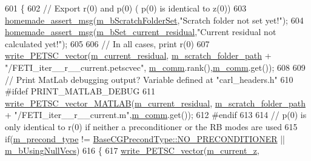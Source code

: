 \begin{DoxyCode}
601 \{
602     \textcolor{comment}{// Export r(0) and p(0) ( p(0) is identical to z(0))}
603     \hyperlink{common__header_8h_a593ccc80b790b2268653fcf6597bf451}{homemade\_assert\_msg}(\hyperlink{classcarl_1_1_f_e_t_i___operations_a8bb9de7de35a2f7d7d5982ae1085ba15}{m\_bScratchFolderSet},\textcolor{stringliteral}{"Scratch folder not set
       yet!"});
604     \hyperlink{common__header_8h_a593ccc80b790b2268653fcf6597bf451}{homemade\_assert\_msg}(\hyperlink{classcarl_1_1_f_e_t_i___operations_a1f1f890054d63bdf25937e6bf66fa5ce}{m\_bSet\_current\_residual},\textcolor{stringliteral}{"Current residual
       not calculated yet!"});
605 
606     \textcolor{comment}{// In all cases, print r(0)}
607     \hyperlink{namespacecarl_a1632084ec1f296b63559648cc9c2047f}{write\_PETSC\_vector}(\hyperlink{classcarl_1_1_f_e_t_i___operations_a6b1154885f5b8303ecbd32ea76df40e5}{m\_current\_residual},
      \hyperlink{classcarl_1_1_f_e_t_i___operations_ad6d35bc9b5221d45452fbc8931f22055}{m\_scratch\_folder\_path} + \textcolor{stringliteral}{"/FETI\_iter\_\_r\_\_current.petscvec"},
      \hyperlink{classcarl_1_1_f_e_t_i___operations_a8cb0ed286667fc9f3ebc2d8ef2a3e13b}{m\_comm}.rank(),\hyperlink{classcarl_1_1_f_e_t_i___operations_a8cb0ed286667fc9f3ebc2d8ef2a3e13b}{m\_comm}.get());
608 
609 \textcolor{comment}{// Print MatLab debugging output? Variable defined at "carl\_headers.h"}
610 \textcolor{preprocessor}{#ifdef PRINT\_MATLAB\_DEBUG}
611     \hyperlink{namespacecarl_a25d36e4c1615382a1832d73c716599db}{write\_PETSC\_vector\_MATLAB}(\hyperlink{classcarl_1_1_f_e_t_i___operations_a6b1154885f5b8303ecbd32ea76df40e5}{m\_current\_residual},
      \hyperlink{classcarl_1_1_f_e_t_i___operations_ad6d35bc9b5221d45452fbc8931f22055}{m\_scratch\_folder\_path} + \textcolor{stringliteral}{"/FETI\_iter\_\_r\_\_current.m"},\hyperlink{classcarl_1_1_f_e_t_i___operations_a8cb0ed286667fc9f3ebc2d8ef2a3e13b}{m\_comm}.get());
612 \textcolor{preprocessor}{#endif}
613 
614     \textcolor{comment}{// p(0) is only identical to r(0) if neither a preconditioner or the RB modes are used}
615     \textcolor{keywordflow}{if}(\hyperlink{classcarl_1_1_f_e_t_i___operations_a76e474f6c1b8bb99cee6a6645f15b25b}{m\_precond\_type} != \hyperlink{namespacecarl_ad52f21755b51ffa926038b59ae194ea8ad142a27fc7dfef6e36c5d01689880cc4}{BaseCGPrecondType::NO\_PRECONDITIONER}
       || \hyperlink{classcarl_1_1_f_e_t_i___operations_aff68699ccceb6e1debc4ecab97dde2ff}{m\_bUsingNullVecs})
616     \{
617         \hyperlink{namespacecarl_a1632084ec1f296b63559648cc9c2047f}{write\_PETSC\_vector}(\hyperlink{classcarl_1_1_f_e_t_i___operations_a56038a186d124078ad4b37c631f50ff0}{m\_current\_z},

\end{DoxyCode}
